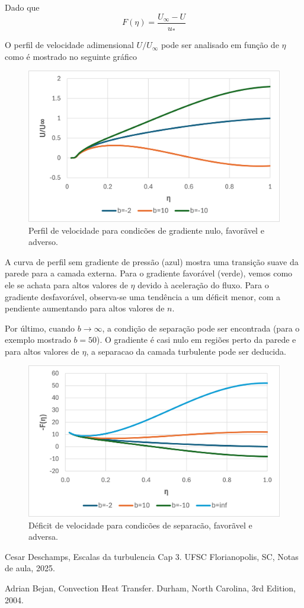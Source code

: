 \documentclass[12pt]{article}
\begin{document}
Dado que 
\begin{equation}
	F(\eta) = \frac{U_\infty - U}{u_*}
\end{equation}

O perfil de velocidade adimensional $U/U_\infty$ pode ser analisado em função de $\eta$ como é mostrado no seguinte gráfico

\begin{figure}[H]
	\centering
	\includegraphics[width=.65\textwidth]{figures/4}
	\caption{Perfil de velocidade para condicões de gradiente nulo, favorãvel e adverso.}
\end{figure}

A curva de perfil sem gradiente de pressão (azul) mostra uma transição suave da parede para a camada externa. Para o gradiente favorável (verde), vemos como ele se achata para altos valores de $\eta$ devido à aceleração do fluxo. Para o gradiente desfavorável, observa-se uma tendência a um déficit menor, com a pendiente aumentando para altos valores de $n$.

Por último, cuando $b \rightarrow\infty$, a condição de separação pode ser encontrada (para o exemplo mostrado $b=50$). O gradiente é casi nulo em regiões perto da parede e para altos valores de $\eta$, a separacao da camada turbulente pode ser deducida.

\begin{figure}[H]
	\centering
	\includegraphics[width=.65\textwidth]{figures/5}
	\caption{Déficit de velocidade para condicões de separacão, favorãvel e adversa.}
\end{figure}

\begin{thebibliography}{999}
	
	
	Cesar Deschamps,
	Escalas da turbulencia Cap 3.
	UFSC Florianopolis, SC,
	Notas de aula,
	2025.
	
	Adrian Bejan,
	Convection Heat Transfer.
	Durham, North Carolina,
	3rd Edition,
	2004.
		
	
\end{thebibliography}
\end{document}

